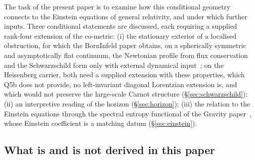 \documentclass[11pt,a4paper]{article}
\begin{document}
    The task of the present paper is to examine how this conditional geometry connects to the Einstein equations of
    general relativity, and under which further inputs.
    Three conditional statements are discussed, each requiring a supplied rank-four extension of the co-metric: (i) the
    stationary exterior of a localised obstruction, for which the Born\textendash Infeld paper obtains, on a spherically
    symmetric and asymptotically flat continuum, the Newtonian profile from flux conservation and the Schwarzschild form
    only with external dynamical input~\cite{Beau2026c}; on the Heisenberg carrier, both need a supplied extension with
    these properties, which Q5b does not provide, no left-invariant diagonal Lorentzian extension is, and which would
    not preserve the large-scale Carnot structure (§\ref{sec:schwarzschild}); (ii) an interpretive reading of the
    horizon (§\ref{sec:horizon}); (iii) the relation to the Einstein equations through the spectral entropy functional
    of the Gravity paper~\cite{Beau2026h}, whose Einstein coefficient is a matching datum (§\ref{sec:einstein}).

  \subsection*{What is and is not derived in this paper}
\end{document}
